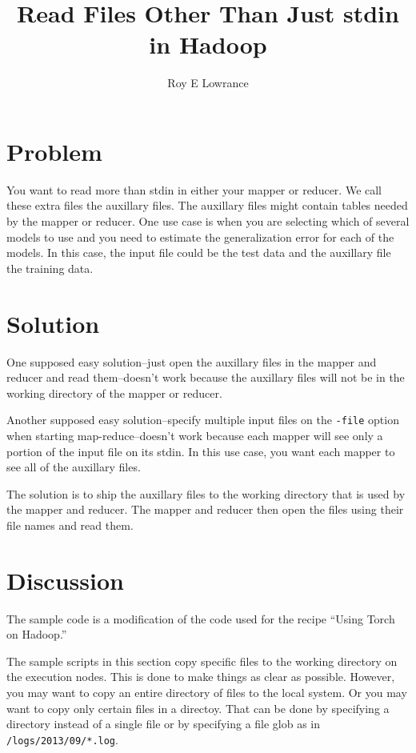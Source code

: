 \documentclass{article}
\let\code\texttt %
\begin{document}
\title{Read Files Other Than Just stdin in Hadoop}
\author{Roy E Lowrance}
\maketitle


\section{Problem}

You want to read more than stdin in either your mapper or reducer. We
call these extra files the auxillary files. The auxillary files might
contain tables needed by the mapper or reducer. One use case is when you
are selecting which of several models to use and you need to estimate
the generalization error for each of the models. In this case, the input
file could be the test data and the auxillary file the training data.

\section{Solution}

One supposed easy solution--just open the auxillary  files in the mapper
and reducer and read them--doesn't work because the auxillary files will not
be in the working directory of the mapper or reducer.

Another supposed easy solution--specify multiple input files on the
\code{-file} option when starting map-reduce--doesn't work because each
mapper will see only a portion of the input file on its stdin. In this
use case, you want each mapper to see all of the auxillary files.

The solution is to ship the auxillary files to the working directory
that is used by the mapper and reducer. The mapper and reducer then open
the files using their file names and read them.

\section{Discussion}

The sample code is a modification of the code used for the recipe
``Using Torch on Hadoop.''

The sample scripts in this section copy specific files to the working
directory on the
execution nodes. This is done to make things as clear as possible.
However, you may want to copy an entire directory of files to the local
system. Or you may want to copy only certain files in a directoy.
That can be done by specifying a directory instead of a single
file or by specifying a file glob as in \code{/logs/2013/09/*.log}.
\end{document}
